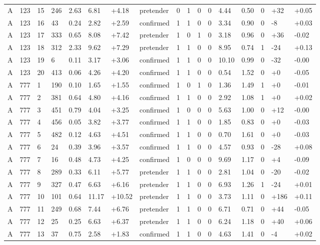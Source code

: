 \documentclass[11pt,a4paper]{article}
\begin{document}
{\begin{longtable}[]{@{}lllllllllllllllll@{}}
A & 123 & 15 & 246 & 2.63 & 6.81 & +4.18 & pretender & 0 & 1 & 0 & 0 & 4.44 & 0.50 & 0 & +32 & +0.05 \\
A & 123 & 16 & 43 & 0.24 & 2.82 & +2.59 & confirmed & 1 & 1 & 0 & 0 & 3.34 & 0.90 & 0 & -8 & +0.03 \\
A & 123 & 17 & 333 & 0.65 & 8.08 & +7.42 & pretender & 1 & 0 & 1 & 0 & 3.18 & 0.96 & 0 & +36 & -0.02 \\
A & 123 & 18 & 312 & 2.33 & 9.62 & +7.29 & pretender & 1 & 1 & 0 & 0 & 8.95 & 0.74 & 1 & -24 & +0.13 \\
A & 123 & 19 & 6 & 0.11 & 3.17 & +3.06 & confirmed & 1 & 1 & 0 & 0 & 10.10 & 0.99 & 0 & -32 & -0.00 \\
A & 123 & 20 & 413 & 0.06 & 4.26 & +4.20 & confirmed & 1 & 1 & 0 & 0 & 0.54 & 1.52 & 0 & +0 & -0.05 \\
A & 777 & 1 & 190 & 0.10 & 1.65 & +1.55 & confirmed & 1 & 0 & 1 & 0 & 1.36 & 1.49 & 1 & +0 & -0.01 \\
A & 777 & 2 & 381 & 0.64 & 4.80 & +4.16 & confirmed & 1 & 1 & 0 & 0 & 2.92 & 1.08 & 1 & +0 & +0.02 \\
A & 777 & 3 & 451 & 0.79 & 4.04 & +3.25 & confirmed & 1 & 0 & 0 & 0 & 5.63 & 1.00 & 0 & +12 & -0.00 \\
A & 777 & 4 & 456 & 0.05 & 3.82 & +3.77 & confirmed & 1 & 1 & 0 & 0 & 1.85 & 0.83 & 0 & +0 & -0.03 \\
A & 777 & 5 & 482 & 0.12 & 4.63 & +4.51 & confirmed & 1 & 1 & 0 & 0 & 0.70 & 1.61 & 0 & +0 & -0.03 \\
A & 777 & 6 & 24 & 0.39 & 3.96 & +3.57 & confirmed & 1 & 1 & 0 & 0 & 4.57 & 0.93 & 0 & -28 & +0.08 \\
A & 777 & 7 & 16 & 0.48 & 4.73 & +4.25 & confirmed & 1 & 0 & 0 & 0 & 9.69 & 1.17 & 0 & +4 & -0.09 \\
A & 777 & 8 & 289 & 0.33 & 6.11 & +5.77 & pretender & 1 & 1 & 0 & 0 & 2.81 & 1.04 & 0 & -20 & -0.02 \\
A & 777 & 9 & 327 & 0.47 & 6.63 & +6.16 & pretender & 1 & 1 & 0 & 0 & 6.93 & 1.26 & 1 & -24 & +0.01 \\
A & 777 & 10 & 101 & 0.64 & 11.17 & +10.52 & pretender & 1 & 1 & 0 & 0 & 3.73 & 1.11 & 0 & +186 & +0.11 \\
A & 777 & 11 & 249 & 0.68 & 7.44 & +6.76 & pretender & 1 & 1 & 0 & 0 & 6.71 & 0.71 & 0 & +44 & -0.05 \\
A & 777 & 12 & 25 & 0.25 & 6.63 & +6.37 & pretender & 1 & 1 & 0 & 0 & 6.24 & 1.18 & 0 & +40 & +0.06 \\
A & 777 & 13 & 37 & 0.75 & 2.58 & +1.83 & confirmed & 1 & 1 & 0 & 0 & 4.63 & 1.41 & 0 & -4 & +0.02 \\

\end{longtable}}
\end{document}
